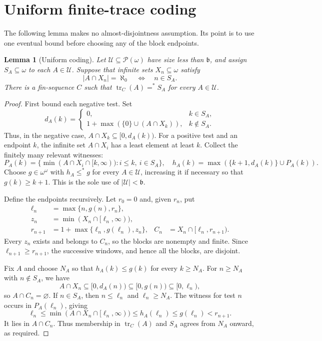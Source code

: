 \documentclass[11pt,letterpaper]{article}
\newtheorem{lemma}[theorem]{Lemma}
\theoremstyle{definition}
\theoremstyle{remark}
\newcommand{\bnum}{\mathfrak{b}}
\newcommand{\U}{\mathcal{U}}
\newcommand{\tr}{\operatorname{tr}}
\begin{document}
\section{Uniform finite-trace coding}\label{sec:coding}
The following lemma makes no almost-disjointness assumption. Its point is
to use one eventual bound before choosing any of the block endpoints.

\begin{lemma}[Uniform coding]\label{lem:coding}
Let $\U\subseteq\mathcal P(\omega)$ have size less than $\bnum$, and assign
$S_A\subseteq\omega$ to each $A\in\U$. Suppose that infinite sets
$X_n\subseteq\omega$ satisfy
\[
 |A\cap X_n|=\aleph_0\quad\Longleftrightarrow\quad n\in S_A.
\]
There is a fin-sequence $C$ such that $\tr_C(A)=^*S_A$ for every $A\in\U$.
\end{lemma}
\begin{proof}
First bound each negative test. Set
\[
 d_A(k)=
 \begin{cases}
 0,&k\in S_A,\\
 1+\max(\{0\}\cup(A\cap X_k)),&k\notin S_A.
 \end{cases}
\]
Thus, in the negative case, $A\cap X_k\subseteq[0,d_A(k))$.
For a positive test and an endpoint $k$, the infinite set $A\cap X_i$ has a
least element at least $k$. Collect the finitely many relevant witnesses:
\[
 P_A(k)=\{\min(A\cap X_i\cap[k,\infty)):i\leq k,\ i\in S_A\},
 \quad h_A(k)=\max(\{k+1,d_A(k)\}\cup P_A(k)).
\]
Choose $g\in\omega^\omega$ with $h_A\leq^*g$ for every $A\in\U$, increasing
it if necessary so that $g(k)\geq k+1$. This is the sole use of $|\U|<\bnum$.

Define the endpoints recursively. Let $r_0=0$ and, given $r_n$, put
\begin{align*}
 \ell_n&=\max\{n,g(n),r_n\},\\
 z_n&=\min(X_n\cap[\ell_n,\infty)),\\
 r_{n+1}&=1+\max\{\ell_n,g(\ell_n),z_n\},
 &C_n&=X_n\cap[\ell_n,r_{n+1}).
\end{align*}
Every $z_n$ exists and belongs to $C_n$, so the blocks are nonempty and finite.
Since $\ell_{n+1}\geq r_{n+1}$, the successive windows, and hence all the
blocks, are disjoint.

Fix $A$ and choose $N_A$ so that $h_A(k)\leq g(k)$ for every $k\geq N_A$.
For $n\geq N_A$ with $n\notin S_A$, we have
\[
 A\cap X_n\subseteq[0,d_A(n))\subseteq[0,g(n))\subseteq[0,\ell_n),
\]
so $A\cap C_n=\varnothing$. If $n\in S_A$, then $n\leq\ell_n$ and
$\ell_n\geq N_A$. The witness for test $n$ occurs in $P_A(\ell_n)$, giving
\[
 \ell_n\leq\min(A\cap X_n\cap[\ell_n,\infty))
 \leq h_A(\ell_n)\leq g(\ell_n)<r_{n+1}.
\]
It lies in $A\cap C_n$. Thus membership in $\tr_C(A)$ and $S_A$ agrees from
$N_A$ onward, as required.
\end{proof}
\end{document}
